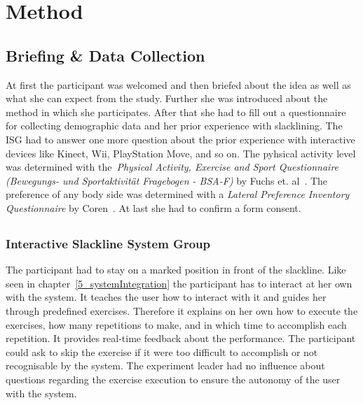 \section{Method}
\begin{comment}
-- briefing
-- methods
-- pre-/post measurement
-- execution
-- interview
\end{comment}
\subsection{Briefing \& Data Collection}
At first the participant was welcomed and then briefed about the idea as well as what she can expect from the study. Further she was introduced about the method in which she participates. 
After that she had to fill out a questionnaire for collecting demographic data and her prior experience with slacklining. The ISG had to answer one more question about the prior experience with interactive devices like Kinect, Wii, PlayStation Move, and so on.
The pyhsical activity level was determined with the~\textit{Physical Activity, Exercise and Sport Questionnaire (Bewegungs- und Sportaktivität Fragebogen - BSA-F)} by Fuchs et. al~\cite{Fuchs2015-bsa}. The preference of any body side was determined with a \textit{Lateral Preference Inventory Questionnaire} by Coren~\cite{Coren1993-lp}. At last she had to confirm a form consent.

\subsection{}
\subsubsection{Interactive Slackline System Group}
The participant had to stay on a marked position in front of the slackline. Like seen in chapter~\ref{5_systemIntegration} the participant has to interact at her own with the system. It teaches the user how to interact with it and guides her through predefined exercises. Therefore it explains on her own how to execute the exercises, how many repetitions to make, and in which time to accomplish each repetition. It provides real-time feedback about the performance. The participant could ask to skip the exercise if it were too difficult to accomplish or not recognisable by the system. The experiment leader had no influence about questions regarding the exercise execution to ensure the autonomy of the user with the system.
